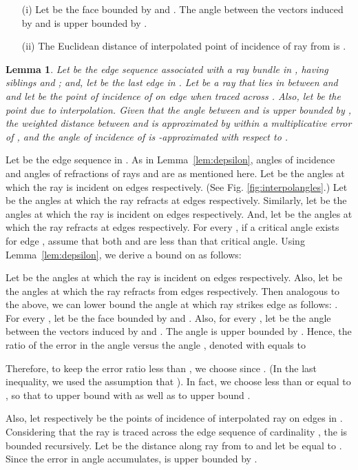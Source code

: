 \documentclass[11pt]{article}
\newtheorem{lemma}{Lemma}[section]
\newenvironment{proof}{\par\noindent{\bf Proof:}}{\mbox{}\hfill\\}
\begin{document}
\begin{itemize}
\vspace{-0.1in}
\item[(i)]
Let  be the face bounded by  and .
The angle between the vectors induced by  and  is upper bounded by .

\item[(ii)]
The Euclidean distance of interpolated point of incidence  of ray  from  is .
\vspace{0.05in}
\end{itemize}

\begin{lemma}
\label{lem:interpolate}
Let  be the edge sequence associated with a ray bundle  in , having siblings  and  ; and, let  be the last edge in .
Let  be a ray that lies in between  and  and let  be the point of incidence of  on edge  when traced across .
Also, let  be the point due to interpolation. 
Given that the angle  between  and  is upper bounded by , the weighted distance  between  and  is approximated by  within a multiplicative error of , and the angle of incidence of  is -approximated with respect to .
\end{lemma}

\begin{proof}
Let  be the edge sequence in .
As in Lemma~\ref{lem:depsilon}, angles of incidence and angles of refractions of rays  and  are as mentioned here.
Let  be the angles at which the ray  is incident on edges  respectively.
(See Fig. \ref{fig:interpolangles}.)
Let  be the angles at which the ray  refracts at edges  respectively.
Similarly, let  be the angles at which the ray  is incident on edges  respectively.
And, let  be the angles at which the ray  refracts at edges  respectively.
For every , if a critical angle exists for edge , assume that both  and  are less than that critical angle.
Using Lemma~\ref{lem:depsilon}, we derive a bound on  as follows: 



Let  be the angles at which the ray  is incident on edges  respectively.
Also, let  be the angles at which the ray  refracts from edges  respectively.
Then analogous to the above, we can lower bound the angle at which ray  strikes edge  as follows: 
.
For every , let  be the face bounded by  and .
Also, for every , let  be the angle between the vectors induced by  and .
The angle  is upper bounded by 
.
Hence, the ratio of the  error in the angle  versus the angle , denoted with  equals to  

Therefore, to keep the error ratio less than , we choose  since . 
(In the last inequality, we used the assumption that ).
In fact, we choose  less than or equal to , so that to upper bound  with  as well as to upper bound .

Also, let  respectively be the points of incidence of interpolated ray  on edges  in .
Considering that the ray  is traced across the edge sequence of cardinality , the  is bounded recursively.
Let  be the distance along ray  from  to  and let  be equal to .
Since the error in angle accumulates,  is upper bounded by .
\end{proof}
\end{document}
